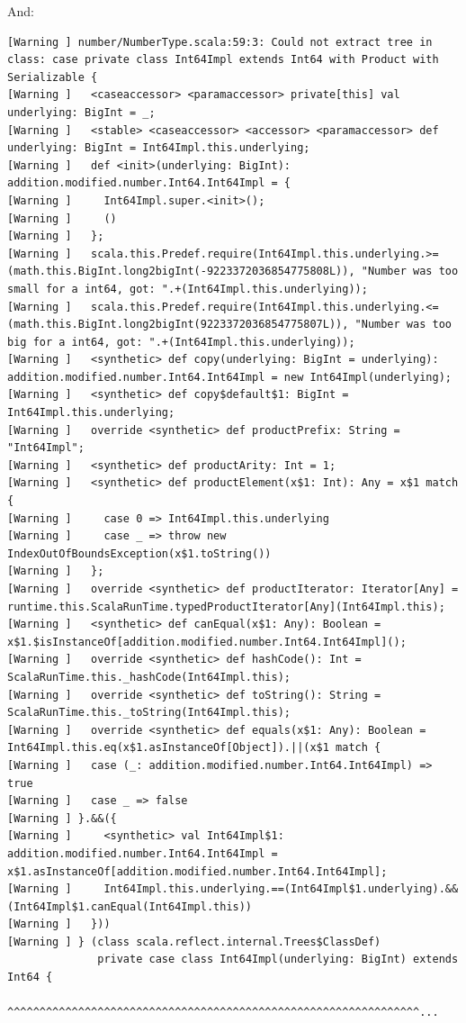 \documentclass[runningheads]{llncs}
\begin{document}
And:
\begin{lstlisting}[style=stainless]
[Warning ] number/NumberType.scala:59:3: Could not extract tree in class: case private class Int64Impl extends Int64 with Product with Serializable {
[Warning ]   <caseaccessor> <paramaccessor> private[this] val underlying: BigInt = _;
[Warning ]   <stable> <caseaccessor> <accessor> <paramaccessor> def underlying: BigInt = Int64Impl.this.underlying;
[Warning ]   def <init>(underlying: BigInt): addition.modified.number.Int64.Int64Impl = {
[Warning ]     Int64Impl.super.<init>();
[Warning ]     ()
[Warning ]   };
[Warning ]   scala.this.Predef.require(Int64Impl.this.underlying.>=(math.this.BigInt.long2bigInt(-9223372036854775808L)), "Number was too small for a int64, got: ".+(Int64Impl.this.underlying));
[Warning ]   scala.this.Predef.require(Int64Impl.this.underlying.<=(math.this.BigInt.long2bigInt(9223372036854775807L)), "Number was too big for a int64, got: ".+(Int64Impl.this.underlying));
[Warning ]   <synthetic> def copy(underlying: BigInt = underlying): addition.modified.number.Int64.Int64Impl = new Int64Impl(underlying);
[Warning ]   <synthetic> def copy$default$1: BigInt = Int64Impl.this.underlying;
[Warning ]   override <synthetic> def productPrefix: String = "Int64Impl";
[Warning ]   <synthetic> def productArity: Int = 1;
[Warning ]   <synthetic> def productElement(x$1: Int): Any = x$1 match {
[Warning ]     case 0 => Int64Impl.this.underlying
[Warning ]     case _ => throw new IndexOutOfBoundsException(x$1.toString())
[Warning ]   };
[Warning ]   override <synthetic> def productIterator: Iterator[Any] = runtime.this.ScalaRunTime.typedProductIterator[Any](Int64Impl.this);
[Warning ]   <synthetic> def canEqual(x$1: Any): Boolean = x$1.$isInstanceOf[addition.modified.number.Int64.Int64Impl]();
[Warning ]   override <synthetic> def hashCode(): Int = ScalaRunTime.this._hashCode(Int64Impl.this);
[Warning ]   override <synthetic> def toString(): String = ScalaRunTime.this._toString(Int64Impl.this);
[Warning ]   override <synthetic> def equals(x$1: Any): Boolean = Int64Impl.this.eq(x$1.asInstanceOf[Object]).||(x$1 match {
[Warning ]   case (_: addition.modified.number.Int64.Int64Impl) => true
[Warning ]   case _ => false
[Warning ] }.&&({
[Warning ]     <synthetic> val Int64Impl$1: addition.modified.number.Int64.Int64Impl = x$1.asInstanceOf[addition.modified.number.Int64.Int64Impl];
[Warning ]     Int64Impl.this.underlying.==(Int64Impl$1.underlying).&&(Int64Impl$1.canEqual(Int64Impl.this))
[Warning ]   }))
[Warning ] } (class scala.reflect.internal.Trees$ClassDef)
              private case class Int64Impl(underlying: BigInt) extends Int64 {
              ^^^^^^^^^^^^^^^^^^^^^^^^^^^^^^^^^^^^^^^^^^^^^^^^^^^^^^^^^^^^^^^^...
\end{lstlisting}
\end{document}
